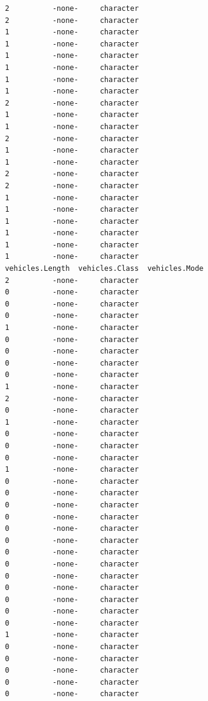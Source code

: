 \documentclass[
  letterpaper,
  DIV=11,
  numbers=noendperiod]{scrreprt}
\begin{document}
\begin{verbatim}
 2          -none-     character      
 2          -none-     character      
 1          -none-     character      
 1          -none-     character      
 1          -none-     character      
 1          -none-     character      
 1          -none-     character      
 1          -none-     character      
 2          -none-     character      
 1          -none-     character      
 1          -none-     character      
 2          -none-     character      
 1          -none-     character      
 1          -none-     character      
 2          -none-     character      
 2          -none-     character      
 1          -none-     character      
 1          -none-     character      
 1          -none-     character      
 1          -none-     character      
 1          -none-     character      
 1          -none-     character      
 vehicles.Length  vehicles.Class  vehicles.Mode
 2          -none-     character               
 0          -none-     character               
 0          -none-     character               
 0          -none-     character               
 1          -none-     character               
 0          -none-     character               
 0          -none-     character               
 0          -none-     character               
 0          -none-     character               
 1          -none-     character               
 2          -none-     character               
 0          -none-     character               
 1          -none-     character               
 0          -none-     character               
 0          -none-     character               
 0          -none-     character               
 1          -none-     character               
 0          -none-     character               
 0          -none-     character               
 0          -none-     character               
 0          -none-     character               
 0          -none-     character               
 0          -none-     character               
 0          -none-     character               
 0          -none-     character               
 0          -none-     character               
 0          -none-     character               
 0          -none-     character               
 0          -none-     character               
 0          -none-     character               
 1          -none-     character               
 0          -none-     character               
 0          -none-     character               
 0          -none-     character               
 0          -none-     character               
 0          -none-     character               

\end{verbatim}
\end{document}
